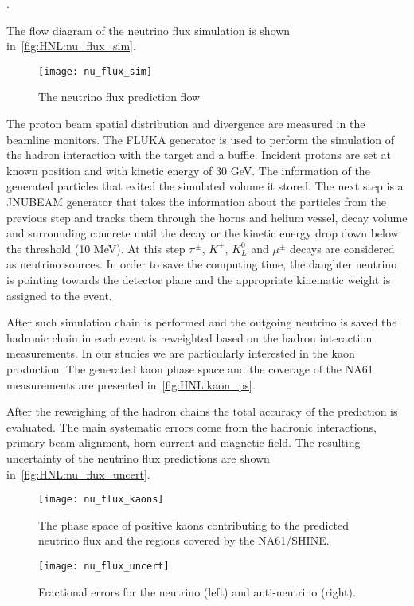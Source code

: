 \documentclass[../main.tex]{subfiles}
\begin{document}
.

The flow diagram of the neutrino flux simulation is shown in~\autoref{fig:HNL:nu_flux_sim}.

\begin{figure}[!ht]
    \centering
    \texttt{[image: nu\_flux\_sim]}
    \caption{The neutrino flux prediction flow}
    \label{fig:HNL:nu_flux_sim}
\end{figure}

The proton beam spatial distribution and divergence are measured in the beamline monitors. The FLUKA generator is used to perform the simulation of the hadron interaction with the target and a buffle. Incident protons are set at known position and with kinetic energy of 30 GeV. The information of the generated particles that exited the simulated volume it stored. The next step is a JNUBEAM generator that takes the information about the particles from the previous step and tracks them through the horns and helium vessel, decay volume and surrounding concrete until the decay or the kinetic energy drop down below the threshold (10 MeV). At this step $\pi^\pm$, $K^\pm$, $K_L^0$ and $\mu^\pm$ decays are considered as neutrino sources. In order to save the computing time, the daughter neutrino is pointing towards the detector plane and the appropriate kinematic weight is assigned to the event.


After such simulation chain is performed and the outgoing neutrino is saved the hadronic chain in each event is reweighted based on the hadron interaction measurements. In our studies we are particularly interested in the kaon production. The generated kaon phase space and the coverage of the NA61 measurements are presented in~\autoref{fig:HNL:kaon_ps}.

After the reweighing of the hadron chains the total accuracy of the prediction is evaluated. The main systematic errors come from the hadronic interactions, primary beam alignment, horn current and magnetic field. The resulting uncertainty of the neutrino flux predictions are shown in~\autoref{fig:HNL:nu_flux_uncert}.

\begin{figure}[!ht]
    \begin{minipage}[!ht]{0.49\linewidth}
        \centering
        \texttt{[image: nu\_flux\_kaons]}
        \caption{The phase space of positive kaons contributing to the predicted neutrino flux and the regions covered by the NA61/SHINE.}
        \label{fig:HNL:kaon_ps}
    \end{minipage}
    \hfill
    \begin{minipage}[!ht]{0.49\linewidth}
        \centering
        \texttt{[image: nu\_flux\_uncert]}
        \caption{Fractional errors for the neutrino (left) and anti-neutrino (right).}
        \label{fig:HNL:nu_flux_uncert}
    \end{minipage}
\end{figure}
\end{document}
